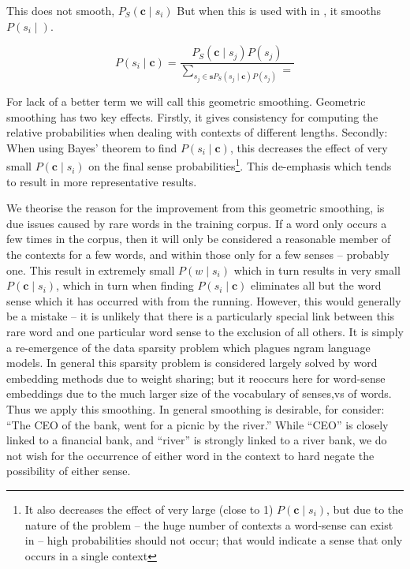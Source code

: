 \documentclass{sig-alternate}
\renewcommand{\c}{\mathbf{c}}
\newcommand{\s}{\mathbf{s}}
\begin{document}
This does not smooth, $P_S(\c \mid s_{i})$
But when this is used with in , it smooths $P(s_{i} \mid )$.

\begin{equation} \label{eq:generalwsdsmoothed}
P(s_{i} \mid \c) = \dfrac{P_S(\c \mid s_{j})P(s_{j})}{\sum_{s_{j}\in\s P_S(s_{j} \mid \c)P(s_{j})} = }
\end{equation}



For lack of a better term we will call this geometric smoothing. Geometric smoothing has two key effects. Firstly, it gives consistency for computing the relative  probabilities when dealing with contexts of different lengths. Secondly: When using Bayes' theorem to find $P(s_{i} \mid \c)$, this decreases the effect of very small $P(\c \mid s_{i})$ on the final sense probabilities\footnote{It also decreases the effect of very large (close to 1) $P(\c \mid s_{i})$, but due to the nature of the problem -- the huge number of contexts a word-sense can exist in -- high probabilities should not occur; that would indicate a sense that only occurs in a single context}. This de-emphasis which tends to result in more representative results.

We theorise the reason for the improvement from this geometric smoothing, is due issues caused by rare words in the training corpus. If a word only occurs a few times in the corpus, then it will only be considered a reasonable member of the contexts for a few words, and within those only for a few senses -- probably one. This result in extremely small $P(w \mid s_i)$ which in turn results in very small $P(\c \mid s_i)$, which in turn when finding $P(s_{i} \mid \c)$ eliminates all but the word sense which it has occurred with from the running. However, this would generally be a mistake -- it is unlikely that there is a particularly special link between this rare word and one particular word sense to the exclusion of all others. It is simply a re-emergence of the data sparsity problem which plagues ngram language models. In general this sparsity problem is considered largely solved by word embedding methods due to weight sharing; but it reoccurs here for word-sense embeddings due to the much larger size of the vocabulary of senses,vs of words. Thus we apply this smoothing. In general smoothing is desirable, for consider: \enquote{The CEO of the bank, went for a picnic by the river.} While \enquote{CEO} is closely linked to a financial bank, and \enquote{river} is strongly linked to a river bank, we do not wish for the occurrence of either word in the context to hard negate the possibility of either sense.
\end{document}
